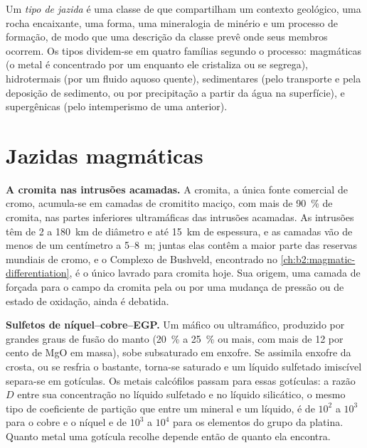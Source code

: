 \begin{definition}\label{def:b2:ore-deposits:types}
Um \emph{tipo de jazida} é uma classe de  que compartilham um contexto
geológico, uma rocha encaixante, uma forma, uma mineralogia de minério e um processo de formação, de modo que uma descrição da
classe prevê onde seus membros ocorrem. Os tipos dividem-se em quatro famílias segundo o processo:
magmáticas (o metal é concentrado por um  enquanto ele cristaliza ou se segrega),
hidrotermais (por um fluido aquoso quente), sedimentares (pelo transporte e pela deposição
de sedimento, ou por precipitação a partir da água na superfície), e supergênicas (pelo intemperismo
de uma  anterior).
\end{definition}

\section{Jazidas magmáticas}\label{sec:b2:ore-deposits:magmatic}

\textbf{A cromita nas intrusões acamadas.} A cromita, a única fonte comercial de cromo,
acumula-se em camadas de cromitito maciço, com mais de \qty{90}{\percent} de cromita, nas partes inferiores
ultramáficas das intrusões acamadas. As intrusões têm de 2 a \qty{180}{km} de diâmetro e até
\qty{15}{km} de espessura, e as camadas vão de menos de um centímetro a 5--\qty{8}{m}; juntas
elas contêm a maior parte das reservas mundiais de cromo, e o Complexo de Bushveld, encontrado no
\cref{ch:b2:magmatic-differentiation}, é o único lavrado para cromita hoje. Sua origem, uma
camada de  forçada para o campo da cromita pela  ou por uma mudança de pressão ou
de estado de oxidação, ainda é debatida.

\textbf{Sulfetos de níquel--cobre--EGP.} Um  máfico ou ultramáfico, produzido por grandes graus de
fusão do manto (\qty{20}{\percent} a \qty{25}{\percent} ou mais, com mais de 12 por cento de MgO em
massa), sobe subsaturado em enxofre. Se assimila enxofre da crosta, ou se resfria o
bastante, torna-se saturado e um líquido sulfetado imiscível separa-se em gotículas. Os
metais calcófilos passam para essas gotículas: a razão $D$ entre sua concentração no líquido
sulfetado e no líquido silicático, o mesmo tipo de coeficiente de partição que entre um
mineral e um líquido, é de $10^2$ a $10^3$ para o cobre e o níquel e de $10^3$ a $10^4$ para os
elementos do grupo da platina. Quanto metal uma gotícula recolhe depende então de quanto  ela encontra.

